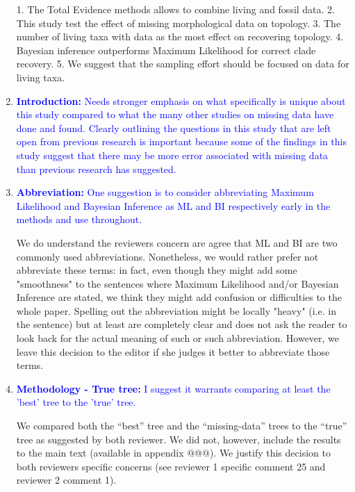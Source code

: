 \documentclass[12pt,letterpaper]{article}
\begin{document}
\begin{enumerate}
1. The Total Evidence methods allows to combine living and fossil data.
2. This study test the effect of missing morphological data on topology.
3. The number of living taxa with data as the most effect on recovering topology.
4. Bayesian inference outperforms Maximum Likelihood for correct clade recovery.
5. We suggest that the sampling effort should be focused on data for living taxa.

\item{\textcolor{blue}{\textbf{Introduction:} Needs stronger emphasis on what specifically is unique about this study compared to what the many other studies on missing data have done and found.
Clearly outlining the questions in this study that are left open from previous research is important because some of the findings in this study suggest that there may be more error associated with missing data than previous research has suggested.}}


\item{\textcolor{blue}{\textbf{Abbreviation:} One suggestion is to consider abbreviating Maximum Likelihood and Bayesian Inference as ML and BI respectively early in the methods and use throughout.}}

We do understand the reviewers concern are agree that ML and BI are two commonly used abbreviations.
Nonetheless, we would rather prefer not abbreviate these terms: in fact, even though they might add some "smoothness" %
to the sentences where Maximum Likelihood and/or Bayesian Inference are stated, we think they might add confusion or difficulties to the whole paper.
Spelling out the abbreviation might be locally "heavy" (i.e. in the sentence) but at least are completely clear and does not ask the reader to look back for the actual meaning of such or such abbreviation.
However, we leave this decision to the editor if she judges it better to abbreviate those terms. %

\item{\textcolor{blue}{\textbf{Methodology - True tree:} I suggest it warrants comparing at least the 'best' tree to the 'true' tree.}}

We compared both the ``best'' tree and the ``missing-data'' trees to the ``true'' tree as suggested by both reviewer. We did not, however, include the results to the main text (available in appendix @@@).
We justify this decision to both reviewers specific concerns (see reviewer 1 specific comment 25 and reviewer 2 comment 1).


\end{enumerate}
\end{document}
